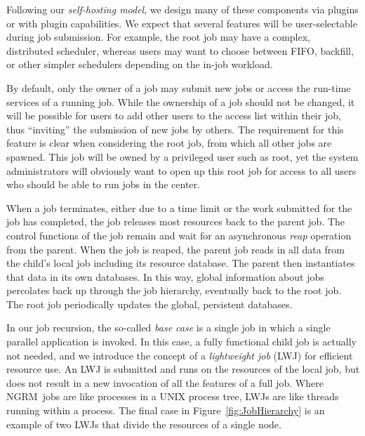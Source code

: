 \documentclass[10pt]{article}
\newcommand{\ngrm}{NGRM}
\begin{document}
Following our {\em self-hosting model}, we design many of these components
via plugins or with plugin capabilities. We expect that several features will
be user-selectable during job submission. For example, the root
job may have a complex, distributed scheduler, whereas users may
want to choose between FIFO, backfill, or other simpler schedulers
depending on the in-job workload.

By default, only the owner of a job may submit new jobs or access
the run-time services of a running job.  While the ownership of a job
should not be changed, it will be possible for users to add other
users to the access list within their job, thus ``inviting'' the
submission of new jobs by others. The requirement for this feature
is clear when considering the root job, from which all other jobs
are spawned. This job will be owned by a privileged user such as
root, yet the system administrators will obviously want to open
up this root job for access to all users who should be able to
run jobs in the center.


When a job terminates, either due to a time limit or the work
submitted for the job has completed, the job releases most resources
back to the parent job. The control functions of the job remain and
wait for an asynchronous {\em reap} operation from the parent. When
the job is reaped, the parent job reads in all data from the child's
local job including its resource database. The parent then instantiates that data in
its own databases. In this way, global information about jobs
percolates back up through the job hierarchy, eventually back to
the root job.  The root job periodically updates the global,
persistent databases.

In our job recursion, the so-called {\em base case} is a
single job in which a single parallel application is invoked. In 
this case, a fully functional child job is actually not needed,
and we introduce the concept of a {\em lightweight job} (LWJ) for efficient
resource use. An LWJ is 
submitted and runs on the resources of the local job, but does not result in
a new invocation of all the features of a full job. Where
\ngrm\ jobs are like processes in a UNIX process tree, LWJs 
are like threads running within a process.
The final case in Figure~\ref{fig:JobHierarchy} is an example
of two LWJs that divide the resources of a single node.
\end{document}
